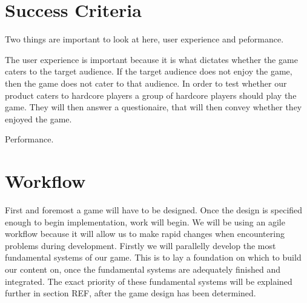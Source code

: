 \section{Success Criteria}
Two things are important to look at here, user experience and peformance.

The user experience is important because it is what dictates whether the game caters to the target audience.
If the target audience does not enjoy the game, then the game does not cater to that audience.
In order to test whether our product caters to hardcore players a group of hardcore players should play the game.
They will then answer a questionaire, that will then convey whether they enjoyed the game.

Performance.

\section{Workflow}
First and foremost a game will have to be designed.
Once the design is specified enough to begin implementation, work will begin.
We will be using an agile workflow because it will allow us to make rapid changes when encountering problems during development.
Firstly we will parallelly develop the most fundamental systems of our game.
This is to lay a foundation on which to build our content on, once the fundamental systems are adequately finished and integrated.
The exact priority of these fundamental systems will be explained further in section  REF, after the game design has been determined.